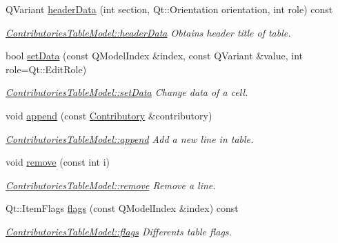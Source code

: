 \begin{DoxyCompactItemize}
Q\+Variant \hyperlink{classGui_1_1Widgets_1_1WdgModels_1_1ContributoriesTableModel_ac08635d8660ddd4444d7f2b75ae3d0ef}{header\+Data} (int section, Qt\+::\+Orientation orientation, int role) const 
\begin{DoxyCompactList}\small\item\em \hyperlink{classGui_1_1Widgets_1_1WdgModels_1_1ContributoriesTableModel_ac08635d8660ddd4444d7f2b75ae3d0ef}{Contributories\+Table\+Model\+::header\+Data} Obtains header title of table. \end{DoxyCompactList}\item 
bool \hyperlink{classGui_1_1Widgets_1_1WdgModels_1_1ContributoriesTableModel_a1c9f7969dc52e5840acfc122fcb2ab48}{set\+Data} (const Q\+Model\+Index \&index, const Q\+Variant \&value, int role=Qt\+::\+Edit\+Role)
\begin{DoxyCompactList}\small\item\em \hyperlink{classGui_1_1Widgets_1_1WdgModels_1_1ContributoriesTableModel_a1c9f7969dc52e5840acfc122fcb2ab48}{Contributories\+Table\+Model\+::set\+Data} Change data of a cell. \end{DoxyCompactList}\item 
void \hyperlink{classGui_1_1Widgets_1_1WdgModels_1_1ContributoriesTableModel_a6d3f0ab976abd9993b731b27fbe3a404}{append} (const \hyperlink{classModels_1_1Contributory}{Contributory} \&contributory)
\begin{DoxyCompactList}\small\item\em \hyperlink{classGui_1_1Widgets_1_1WdgModels_1_1ContributoriesTableModel_a6d3f0ab976abd9993b731b27fbe3a404}{Contributories\+Table\+Model\+::append} Add a new line in table. \end{DoxyCompactList}\item 
void \hyperlink{classGui_1_1Widgets_1_1WdgModels_1_1ContributoriesTableModel_a76666bbbc940867b6ff3366424f72e26}{remove} (const int i)
\begin{DoxyCompactList}\small\item\em \hyperlink{classGui_1_1Widgets_1_1WdgModels_1_1ContributoriesTableModel_a76666bbbc940867b6ff3366424f72e26}{Contributories\+Table\+Model\+::remove} Remove a line. \end{DoxyCompactList}\item 
Qt\+::\+Item\+Flags \hyperlink{classGui_1_1Widgets_1_1WdgModels_1_1ContributoriesTableModel_a6bf3e8c45bb499e82546be456a7de77b}{flags} (const Q\+Model\+Index \&index) const 
\begin{DoxyCompactList}\small\item\em \hyperlink{classGui_1_1Widgets_1_1WdgModels_1_1ContributoriesTableModel_a6bf3e8c45bb499e82546be456a7de77b}{Contributories\+Table\+Model\+::flags} Differents table flags. \end{DoxyCompactList}\item 

\end{DoxyCompactItemize}
